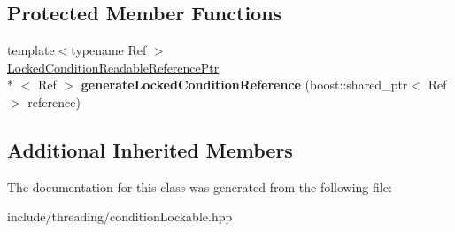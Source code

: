 \subsection*{Protected Member Functions}
\begin{DoxyCompactItemize}
\item 
\hypertarget{classcore_1_1threading_1_1_read_write_condition_lock_proxy_ab52d22439e508bbff6bd52d06e7d586a}{{\footnotesize template$<$typename Ref $>$ }\\\hyperlink{classcore_1_1threading_1_1_locked_condition_readable_reference_ptr}{Locked\-Condition\-Readable\-Reference\-Ptr}\\*
$<$ Ref $>$ {\bfseries generate\-Locked\-Condition\-Reference} (boost\-::shared\-\_\-ptr$<$ Ref $>$ reference)}\label{classcore_1_1threading_1_1_read_write_condition_lock_proxy_ab52d22439e508bbff6bd52d06e7d586a}

\end{DoxyCompactItemize}
\subsection*{Additional Inherited Members}


The documentation for this class was generated from the following file\-:\begin{DoxyCompactItemize}
\item 
include/threading/condition\-Lockable.\-hpp\end{DoxyCompactItemize}
